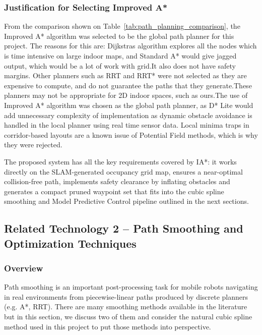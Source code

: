 \subsubsection{Justification for Selecting Improved A*}

From the comparison shown on Table~\ref{tab:path_planning_comparison}, the Improved A* algorithm was selected to be the global path planner for this project. The reasons for this are: Dijkstras algorithm explores all the nodes which is time intensive on large indoor maps, and Standard A* would give jagged output, which would be a lot of work with grid.It also does not have safety margins. Other planners such as RRT and RRT* were not selected as they are expensive to compute, and do not guarantee the paths that they generate.These planners may not be appropriate for 2D indoor spaces, such as ours.The use of Improved A* algorithm was chosen as the global path planner, as D* Lite would add unnecessary complexity of implementation as dynamic obstacle avoidance is handled in the local planner using real time sensor data. Local minima traps in corridor-based layouts are a known issue of Potential Field methods, which is why they were rejected.

The proposed system has all the key requirements covered by IA*: it works directly on the SLAM-generated occupancy grid map, ensures a near-optimal collision-free path, implements safety clearance by inflating obstacles and generates a compact pruned waypoint set that fits into the cubic spline smoothing and Model Predictive Control pipeline outlined in the next sections.

\subsection{Related Technology 2 -- Path Smoothing and Optimization Techniques}

\subsubsection{Overview}

Path smoothing is an important post-processing task for mobile robots navigating in real environments from piecewise-linear paths produced by discrete planners (e.g. A*, RRT). There are many smoothing methods available in the literature but in this section, we discuss two of them and consider the natural cubic spline method used in this project to put those methods into perspective.

